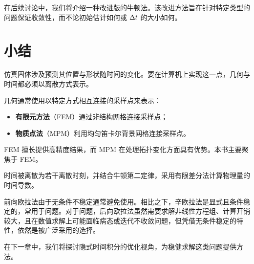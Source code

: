 在后续讨论中，我们将介绍一种改进版的牛顿法。该改进方法旨在针对特定类型的问题保证收敛性，而不论初始估计如何或 $\Delta t$ 的大小如何。

\section{小结}
\label{sec:ch01-summary}

仿真固体涉及预测其位置与形状随时间的变化。要在计算机上实现这一点，几何与时间都必须以离散方式表示。

几何通常使用以特定方式相互连接的采样点来表示：
\begin{itemize}
  \item \textbf{有限元方法}（FEM）通过非结构网格连接采样点；
  \item \textbf{物质点法}（MPM）利用均匀笛卡尔背景网格连接采样点。
\end{itemize}
FEM 擅长提供高精度结果，而 MPM 在处理拓扑变化方面具有优势。本书主要聚焦于 FEM。

时间被离散为若干离散时刻，并结合牛顿第二定律，采用有限差分法计算物理量的时间导数。

前向欧拉法由于无条件不稳定通常避免使用。相比之下，辛欧拉法是显式且条件稳定的，常用于问题。对于问题，后向欧拉法虽然需要求解非线性方程组、计算开销较大，且在数值求解上可能面临病态或迭代不收敛问题，但凭借无条件稳定的特性，依然是被广泛采用的选择。

在下一章中，我们将探讨隐式时间积分的优化视角，为稳健求解这类问题提供方法。
